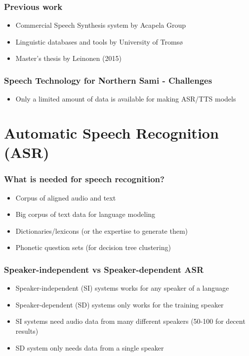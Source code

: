\begin{frame}
\frametitle{Previous work}
\begin{itemize}
\item Commercial Speech Synthesis system by Acapela Group\\
\item Linguistic databases and tools by University of Tromsø\\[1cm]
\item Master's thesis by Leinonen (2015)\\
\end{itemize}
\end{frame}

\begin{frame}
\frametitle{Speech Technology for Northern Sami - Challenges}
\begin{itemize}
\item Only a limited amount of data is available for making ASR/TTS models
\end{itemize}
\end{frame}



\section[Speech Recognition]{Automatic Speech Recognition (ASR)}
\begin{frame}
\frametitle{What is needed for speech recognition?}
\begin{itemize}
\item Corpus of aligned audio and text
\item Big corpus of text data for language modeling
\item Dictionaries/lexicons (or the expertise to generate them)
\item Phonetic question sets (for decision tree clustering)
\end{itemize}
\end{frame}

\begin{frame}
\frametitle{Speaker-independent vs Speaker-dependent ASR}
\begin{itemize}
\item Speaker-independent (SI) systems works for any speaker of a language
\item Speaker-dependent (SD) systems  only works for the training speaker
\item SI systems need audio data from many different speakers (50-100 for decent results)
\item SD system only needs data from a single speaker
\end{itemize}
\end{frame}


